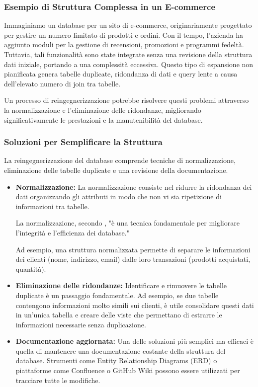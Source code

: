 \subsubsection{Esempio di Struttura Complessa in un E-commerce}
Immaginiamo un database per un sito di e-commerce, originariamente progettato per gestire un numero limitato di prodotti e ordini. Con il tempo, l'azienda ha aggiunto moduli per la gestione di recensioni, promozioni e programmi fedeltà. Tuttavia, tali funzionalità sono state integrate senza una revisione della struttura dati iniziale, portando a una complessità eccessiva. Questo tipo di espansione non pianificata genera tabelle duplicate, ridondanza di dati e query lente a causa dell'elevato numero di join tra tabelle. 

Un processo di reingegnerizzazione potrebbe risolvere questi problemi attraverso la normalizzazione e l’eliminazione delle ridondanze, migliorando significativamente le prestazioni e la manutenibilità del database.


\subsubsection{Soluzioni per Semplificare la Struttura}
La reingegnerizzazione del database comprende tecniche di normalizzazione, eliminazione delle tabelle duplicate e una revisione della documentazione.


\begin{itemize}
    \item \textbf{Normalizzazione:} La normalizzazione consiste nel ridurre la ridondanza dei dati organizzando gli attributi in modo che non vi sia ripetizione di informazioni tra tabelle.

    La normalizzazione, secondo \cite{Sil19}, "è una tecnica fondamentale per migliorare l'integrità e l'efficienza dei database."
    
    Ad esempio, una struttura normalizzata permette di separare le informazioni dei clienti (nome, indirizzo, email) dalle loro transazioni (prodotti acquistati, quantità).
    \item \textbf{Eliminazione delle ridondanze:} Identificare e rimuovere le tabelle duplicate è un passaggio fondamentale. Ad esempio, se due tabelle contengono informazioni molto simili sui clienti, è utile consolidare questi dati in un'unica tabella e creare delle viste che permettano di estrarre le informazioni necessarie senza duplicazione.
    \item \textbf{Documentazione aggiornata:} Una delle soluzioni più semplici ma efficaci è quella di mantenere una documentazione costante della struttura del database. Strumenti come Entity Relationship Diagrams (ERD) o piattaforme come Confluence o GitHub Wiki possono essere utilizzati per tracciare tutte le modifiche.
\end{itemize}

